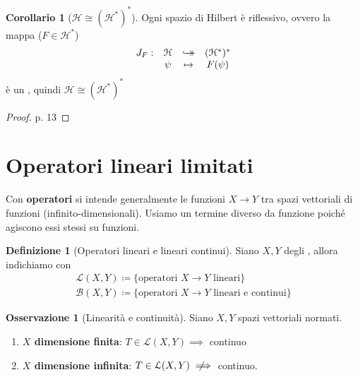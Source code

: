 \documentclass[a4paper,10pt]{article}
\theoremstyle{definition}
\newcommand{\hookdoubleheadrightarrow}{\hookrightarrow\mathrel{\mspace{-15mu}}\rightarrow}
\newcommand{\bij}{\hookdoubleheadrightarrow} %
\newcommand{\notimplies}{\mathrel{{\ooalign{\hidewidth$\not\phantom{=}$\hidewidth\cr$\implies$}}}}  %
\newcommand{\hil}{\mathcal{H}} %
\theoremstyle{indentdefinition}
\newtheorem{defn}{Definizione}[section]
\theoremstyle{indenttheorem}
\newtheorem{cor}{Corollario}
\theoremstyle{myremark}
\newtheorem*{rem*}{Osservazione}
\theoremstyle{indentgeneral}
\begin{document}
\begin{cor}[$\hil\cong (\hil^*)^*$]
    Ogni spazio di Hilbert è riflessivo, ovvero la mappa ($F\in\hil^*$)
    $$\begin{array}{cccc}
     J_F:& \hil & \bij& (\hil^*)^* \\
     & \psi  & \mapsto & F(\psi) 
   \end{array}$$
   è un , quindi $\hil\cong (\hil^*)^*$
\end{cor}

\begin{proof}
    p. 13
\end{proof}



\pagebreak
\section{Operatori lineari limitati}
Con \textbf{operatori} si intende generalmente le funzioni $X\to Y$ tra spazi vettoriali di funzioni (infinito-dimensionali). Usiamo un termine diverso da funzione poiché agiscono essi stessi su funzioni.
\begin{defn}[Operatori lineari e lineari continui]
    Siano $X,Y$ degli , allora indichiamo con 
    $$\begin{array}{l}
       \mathcal{L}(X,Y) \coloneqq\{\text{operatori $X\to Y$ lineari}\} \\
        \mathcal{B}(X,Y)\coloneqq \{\text{operatori $X\to Y$ lineari e continui}\}
    \end{array}$$
\end{defn}

\begin{rem*}[Linearità e continuità] Siano $X,Y$ spazi vettoriali normati.
\begin{enumerate}
    \item \textbf{$X$ dimensione finita}: $T\in\mathcal{L}(X,Y)\implies$ continuo
     \item \textbf{$X$ dimensione infinita}: $T\in\mathcal{L}(X,Y)\notimplies$ continuo. 
\end{enumerate}
\end{rem*}
\end{document}
